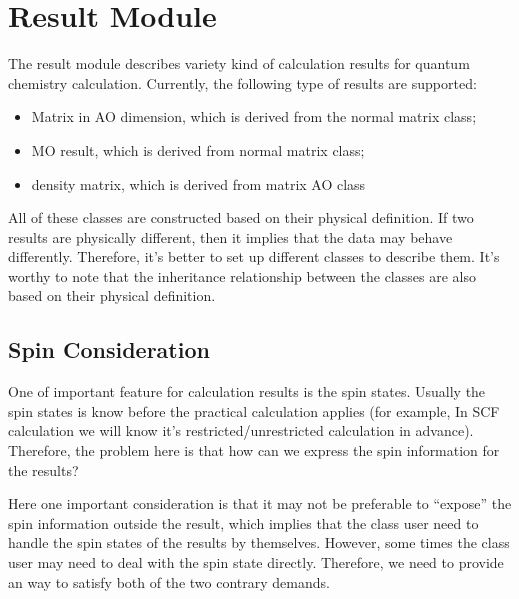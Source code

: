 %
%
%
\chapter{Result Module}

The result module describes variety kind of calculation results for
quantum chemistry calculation. Currently, the following 
type of results are supported:
\begin{itemize}
  \item Matrix in AO dimension, which is derived from the normal matrix class;
  \item MO result, which is derived from normal matrix class;
  \item density matrix, which is derived from matrix AO class
\end{itemize}
All of these classes are constructed based on their physical definition.
If two results are physically different, then it implies that the data
may behave differently. Therefore, it's better to set up different classes
to describe them. It's worthy to note that the inheritance relationship
between the classes are also based on their physical definition.

\section{Spin Consideration}
%
%

One of important feature for calculation results is the spin states.  Usually
the spin states is know before the practical calculation applies (for example,
In SCF calculation we will know it's restricted/unrestricted calculation in
advance). Therefore, the problem here is that how can we express the spin 
information for the results?

Here one important consideration is that it may not be preferable to ``expose'' 
the spin information outside the result, which implies that the class 
user need to handle the spin states of the results by themselves. However,
some times the class user may need to deal with the spin state directly. Therefore,
we need to provide an way to satisfy both of the two contrary demands.

